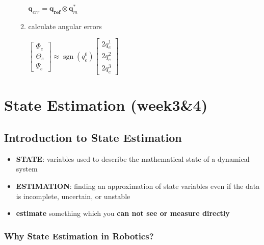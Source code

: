 \documentclass[]{article}
\begin{document}
\begin{itemize}
\begin{enumerate}
    \(\boldsymbol{q}_{e r r}=\boldsymbol{q}_{\boldsymbol{r e f}} \otimes \boldsymbol{q}_{m}^{*}\)
  \item
    calculate angular errors

    \( \left[\begin{array}{c} \Phi_{e} \\ \Theta_{e} \\ \Psi_{e} \end{array}\right] \approx \operatorname{sgn}\left(q_{e}^{0}\right)\left[\begin{array}{l} 2 q_{e}^{1} \\ 2 q_{e}^{2} \\ 2 q_{e}^{3} \end{array}\right]\)
  \end{enumerate}
\end{itemize}

\section{State Estimation (week3\&4)}\label{header-n829}

\subsection{Introduction to State Estimation}\label{header-n830}

\begin{itemize}
\item
  \textbf{STATE}: variables used to describe the mathematical state of a
  dynamical system
\item
  \textbf{ESTIMATION}: finding an approximation of state variables even
  if the data is incomplete, uncertain, or unstable
\item
  \textbf{estimate} something which you \textbf{can not see or measure
  directly}
\end{itemize}

\subsubsection{Why State Estimation in Robotics?}\label{header-n838}
\end{document}
